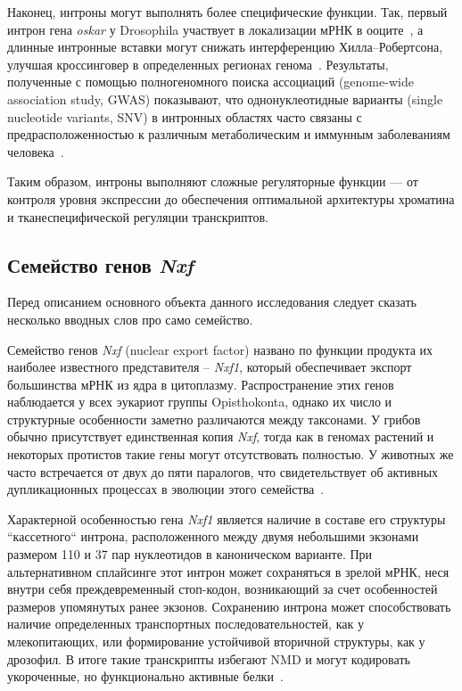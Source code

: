 Наконец, интроны могут выполнять более специфические функции.
Так, первый интрон гена \textit{oskar} у Drosophila участвует в локализации мРНК в ооците~\cite{Siemens2004}, а длинные интронные вставки могут снижать интерференцию Хилла–Робертсона, улучшая кроссинговер в определенных регионах генома~\cite{Comeron2008}.
Результаты, полученные с помощью полногеномного поиска ассоциаций (genome-wide association study, GWAS) показывают, что однонуклеотидные варианты (single nucleotide variants, SNV) в интронных областях часто связаны с предрасположенностью к различным метаболическим и иммунным заболеваниям человека~\cite{Welter2014}.

Таким образом, интроны выполняют сложные регуляторные функции — от контроля уровня экспрессии до обеспечения оптимальной архитектуры хроматина и тканеспецифической регуляции транскриптов.


\subsection{Семейство генов \textit{Nxf}}

Перед описанием основного объекта данного исследования следует сказать нес\-колько вводных слов про само семейство.

Семейство генов \textit{Nxf} (nuclear export factor) названо по функции продукта их наиболее известного представителя – \textit{Nxf1}, который обеспечивает экспорт большинства мРНК из ядра в цитоплазму.
Распространение этих генов наблюдается у всех эукариот группы Opisthokonta, однако их число и структурные особенности заметно различаются между таксонами.
У грибов обычно присутствует единственная копия \textit{Nxf}, тогда как в геномах растений и некоторых протистов такие гены могут отсутствовать полностью.
У животных же часто встречается от двух до пяти паралогов, что свидетельствует об активных дупликационных процессах в эволюции этого семейства~\cite{Mamon2013}.

Характерной особенностью гена \textit{Nxf1} является наличие в составе его структуры ``кассетного`` интрона, расположенного между двумя небольшими экзонами размером 110 и 37 пар нуклеотидов в каноническом варианте.
При альтернативном сплайсинге этот интрон может сохраняться в зрелой мРНК, неся внутри себя преждевременный стоп-кодон, возникающий за счет особенностей размеров упомянутых ранее экзонов.
Сохранению интрона может способствовать наличие определенных транспортных последовательностей, как у млекопитающих, или формирование устойчивой вторичной структуры, как у дрозофил.
В итоге такие транскрипты избегают NMD и могут кодировать укороченные, но функционально активные белки~\cite{Golubkova2012,Mamon2013}.

